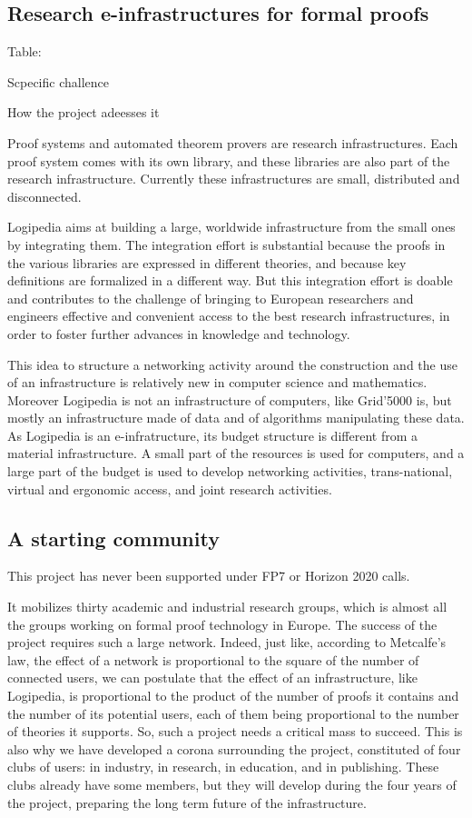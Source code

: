 \subsection{Research e-infrastructures for formal proofs}


{\color{red} Table:

  Scpecific challence

  How the project adeesses it}



Proof systems and automated theorem provers are research
infrastructures. Each proof system comes with its own library, and
these libraries are also part of the research infrastructure.  Currently
these infrastructures are small, distributed and disconnected.

Logipedia aims at building a large, worldwide infrastructure from the
small ones by integrating them.  The integration effort is substantial
because the proofs in the various libraries are expressed in different
theories, and because key definitions are formalized in a different
way.  But this integration effort is doable and contributes to the
challenge of bringing to European researchers and engineers effective and
convenient access to the best research infrastructures, in order to
foster further advances in knowledge and technology.

This idea to structure a networking activity around the construction
and the use of an infrastructure is relatively new in computer science
and mathematics. Moreover Logipedia is not an infrastructure of
computers, like Grid'5000 is, but mostly an infrastructure made of
data and of algorithms manipulating these data.  As Logipedia is an
e-infratructure, its budget structure is different from a material
infrastructure. A small part of the resources is used for computers,
and a large part of the budget is used to develop networking
activities, trans-national, virtual and ergonomic access, and joint
research activities.

\subsection{A starting community}

This project has never been supported under FP7 or Horizon 2020 calls.

It mobilizes thirty academic and industrial research groups, which is
almost all the groups working on formal proof technology in Europe.
The success of the project requires such a large network.  Indeed,
just like, according to Metcalfe's law, the effect of a network is
proportional to the square of the number of connected users, we can
postulate that the effect of an infrastructure, like Logipedia, is
proportional to the product of the number of proofs it contains and
the number of its potential users, each of them being proportional to
the number of theories it supports. So, such a project needs a
critical mass to succeed. This is also why we have developed a corona
surrounding the project, constituted of four clubs of users: in
industry, in research, in education, and in publishing. These clubs
already have some members, but they will develop during the four years
of the project, preparing the long term future of the infrastructure.

